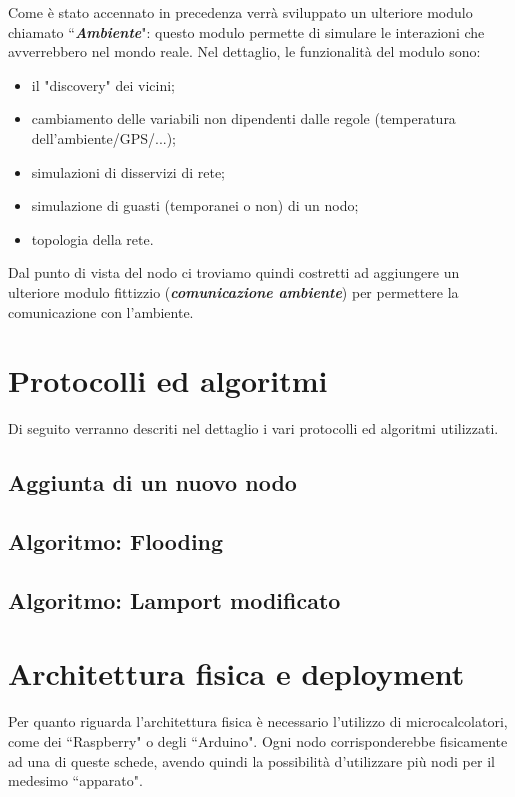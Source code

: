 \documentclass{memoir}
\begin{document}
Come è stato accennato in precedenza verrà sviluppato un ulteriore modulo chiamato
``\textbf{\textit{Ambiente}}": questo modulo permette di simulare le interazioni
	   che avverrebbero nel mondo reale. Nel dettaglio, le funzionalità del modulo
	   sono:
\begin{itemize}
	\item il "discovery" dei vicini;
	\item cambiamento delle variabili non dipendenti dalle regole (temperatura dell'ambiente/GPS/...);
	\item simulazioni di disservizi di rete;
	\item simulazione di guasti (temporanei o non) di un nodo;
	\item topologia della rete.
\end{itemize}
Dal punto di vista del nodo ci troviamo quindi costretti ad aggiungere un ulteriore
	   modulo fittizzio (\textbf{\textit{comunicazione ambiente}}) per permettere la
	   comunicazione
	   con l'ambiente.

\section{Protocolli ed algoritmi}

Di seguito verranno descriti nel dettaglio i vari protocolli ed algoritmi utilizzati.

\subsection{Aggiunta di un nuovo nodo}
\subsection{}

\subsection{Algoritmo: Flooding}
\subsection{Algoritmo: Lamport modificato}

\section{Architettura fisica e deployment}
Per quanto riguarda l'architettura fisica è necessario l'utilizzo di microcalcolatori,
	   come dei ``Raspberry" o degli ``Arduino". Ogni nodo corrisponderebbe fisicamente
	   ad una di queste schede, avendo quindi la possibilità d'utilizzare più nodi per
	   il medesimo ``apparato".
\end{document}
